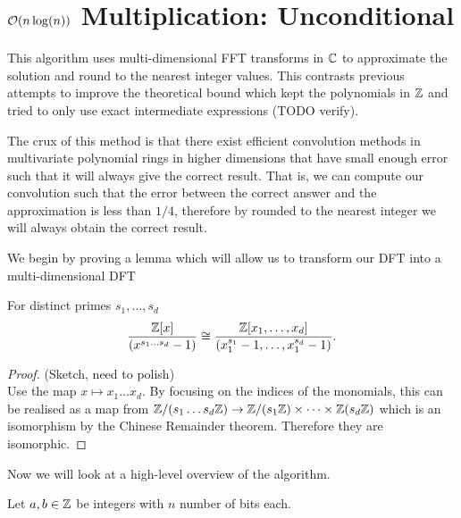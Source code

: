 \section{$\mathcal O(n\log(n))$ Multiplication: Unconditional}
\label{subsec:nlogn}

This algorithm uses multi-dimensional FFT transforms in ${\mathbb C}$ to approximate the solution and round to the nearest integer values. This contrasts previous attempts to improve the theoretical bound which kept the polynomials in ${\mathbb Z}$ and tried to only use exact intermediate expressions (TODO verify).


The crux of this method is that there exist efficient convolution methods in multivariate polynomial rings in higher dimensions that have small enough error such that it will always give the correct result. That is, we can compute our convolution such that the error between the correct answer and the approximation is less than $1 / 4$, therefore by rounded to the nearest integer we will always obtain the correct result.

We begin by proving a lemma which will allow us to transform our DFT into a multi-dimensional DFT

\begin{lemma}
    For distinct primes $s_1, \ldots, s_d$ 
    \[
        \frac{{\mathbb Z}[x]}{(x^{s_1\ldots s_d} - 1)} \cong \frac{{\mathbb Z}[x_1, \ldots, x_d]}{(x_1^{s_1} - 1, \ldots, x_1^{s_d} - 1)}.
    \]
\end{lemma}

\begin{proof}
    (Sketch, need to polish)\\
    Use the map $x \mapsto x_1\ldots x_d$. By focusing on the indices of the monomials, this can be realised as a map from ${\mathbb Z}/(s_1\ldots s_d {\mathbb Z}) \to {\mathbb Z}/(s_1 {\mathbb Z}) \times \cdots \times {\mathbb Z}(s_d {\mathbb Z})$ which is an isomorphism by the Chinese Remainder theorem. Therefore they are isomorphic.
\end{proof}

Now we will look at a high-level overview of the algorithm.

Let $a, b \in {\mathbb Z}$ be integers with $n$ number of bits each.

